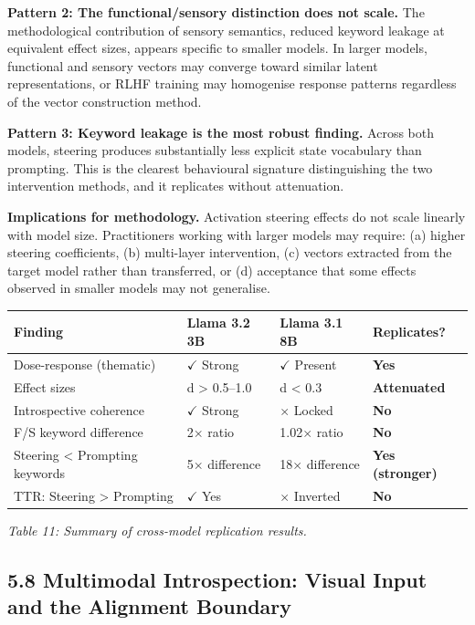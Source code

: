\documentclass[11pt,a4paper]{article}
\begin{document}
\textbf{Pattern 2: The functional/sensory distinction does not scale.} The methodological contribution of sensory semantics, reduced keyword leakage at equivalent effect sizes, appears specific to smaller models. In larger models, functional and sensory vectors may converge toward similar latent representations, or RLHF training may homogenise response patterns regardless of the vector construction method.

\textbf{Pattern 3: Keyword leakage is the most robust finding.} Across both models, steering produces substantially less explicit state vocabulary than prompting. This is the clearest behavioural signature distinguishing the two intervention methods, and it replicates without attenuation.

\textbf{Implications for methodology.} Activation steering effects do not scale linearly with model size. Practitioners working with larger models may require: (a) higher steering coefficients, (b) multi-layer intervention, (c) vectors extracted from the target model rather than transferred, or (d) acceptance that some effects observed in smaller models may not generalise.

\begin{center}
\begin{tabular}{llll}
\toprule
Finding & Llama 3.2 3B & Llama 3.1 8B & Replicates? \\
\midrule
Dose-response (thematic) & \ensuremath{\checkmark} Strong & \ensuremath{\checkmark} Present & \textbf{Yes} \\
Effect sizes & d > 0.5--1.0 & d < 0.3 & \textbf{Attenuated} \\
Introspective coherence & \ensuremath{\checkmark} Strong & \ensuremath{\times} Locked & \textbf{No} \\
F/S keyword difference & 2\ensuremath{\times} ratio & 1.02\ensuremath{\times} ratio & \textbf{No} \\
Steering < Prompting keywords & 5\ensuremath{\times} difference & 18\ensuremath{\times} difference & \textbf{Yes (stronger)} \\
TTR: Steering > Prompting & \ensuremath{\checkmark} Yes & \ensuremath{\times} Inverted & \textbf{No} \\
\bottomrule
\end{tabular}
\end{center}

\emph{Table 11: Summary of cross-model replication results.}

\subsection*{5.8 Multimodal Introspection: Visual Input and the Alignment Boundary}
\end{document}
